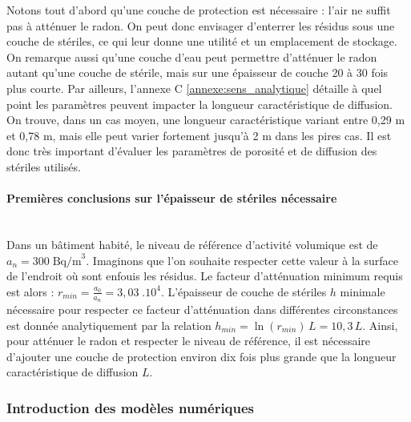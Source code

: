 \documentclass{article}
\begin{document}
Notons tout d’abord qu’une couche de protection est nécessaire : l’air ne suffit pas à atténuer le radon. On peut donc envisager d’enterrer les résidus sous une couche de stériles, ce qui leur donne une utilité et un emplacement de stockage. On remarque aussi qu’une couche d’eau peut permettre d’atténuer le radon autant qu’une couche de stérile, mais sur une épaisseur de couche 20 à 30 fois plus courte. Par ailleurs, l'annexe C \ref{annexe:sens_analytique} détaille à quel point les paramètres peuvent impacter la longueur caractéristique de diffusion. On trouve, dans un cas moyen, une longueur caractéristique variant entre 0,29 m et 0,78 m, mais elle peut varier fortement jusqu'à 2 m dans les pires cas. Il est donc très important d'évaluer les paramètres de porosité et de diffusion des stériles utilisés.

\paragraph{Premières conclusions sur l'épaisseur de stériles nécessaire \\ \\}
Dans un bâtiment habité, le niveau de référence d’activité volumique est de $a_n=300 \; \text{Bq/m}^3$. Imaginons que l’on souhaite respecter cette valeur à la surface de l’endroit où sont enfouis les résidus. Le facteur d’atténuation minimum requis est alors : $r_{min}=\frac{a_0}{a_n} =3,03 \; .10^4$. L’épaisseur de couche de stériles $h$ minimale nécessaire pour respecter ce facteur d’atténuation dans différentes circonstances est donnée analytiquement par la relation $h_{min}=\ln(r_{min}) \,L =10,3 \,L $. Ainsi, pour atténuer le radon et respecter le niveau de référence, il est nécessaire d’ajouter une couche de protection environ dix fois plus grande que la longueur caractéristique de diffusion $L$.

\subsubsection{Introduction des modèles numériques}
\end{document}
